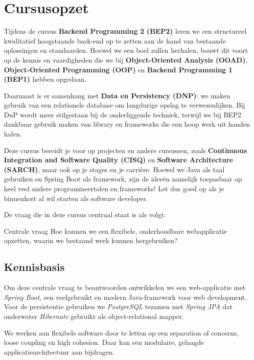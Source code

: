 \chapter{Cursusopzet}
Tijdens de cursus \textbf{Backend Programming 2 (BEP2)} leren we 
een structureel kwalitatief hoogstaande back-end 
op te zetten aan de hand van bestaande oplossingen en standaarden.
Hoewel we een boel zullen herhalen, bouwt dit voort 
op de kennis en vaardigheden
die we bij \textbf{Object-Oriented Analysis (OOAD)}, 
\textbf{Object-Oriented Programming (OOP)}
en \textbf{Backend Programming 1 (BEP1)} hebben opgedaan.

Daarnaast is er samenhang met \textbf{Data en Persistency (DNP)}:
we maken gebruik van een  relationele database om langdurige 
opslag te verwezenlijken. Bij DnP wordt meer stilgestaan bij 
de onderliggende techniek, terwijl we bij BEP2 dankbaar gebruik 
maken van library en frameworks die een hoop werk uit handen halen.

Deze cursus bereidt je voor op projecten en andere cursussen, zoals
\textbf{Continuous Integration and Software Quality (CISQ)} 
en \textbf{Software Architecture (SARCH)},
maar ook op je stages en je carrière. Hoewel we Java als taal gebruiken 
en Spring Boot als framework, zijn de ideeën namelijk
toepasbaar op heel veel andere programmeertalen en frameworks!
Let dus goed op als je binnenkort al wil starten als software developer.

De vraag die in deze cursus centraal staat is als volgt:

\begin{defbox}{Centrale vraag}
Hoe kunnen we een flexibele, onderhoudbare webapplicatie opzetten, waarin we bestaand werk kunnen hergebruiken?
\end{defbox}

\section{Kennisbasis}
Om deze centrale vraag te beantwoorden ontwikkelen we 
een web-applicatie met \textit{Spring Boot}, een veelgebruikt 
en modern Java-framework voor web development. Voor de persistentie 
gebruiken we \textit{PostgreSQL} tezamen met \textit{Spring JPA} dat
onderwater \textit{Hibernate} gebruikt als object-relational mapper.

We werken aan flexibele software door te letten
op een separation of concerns, loose coupling en high cohesion.
Daar kan een modulaire, gelaagde applicatiearchitectuur aan bijdragen.

